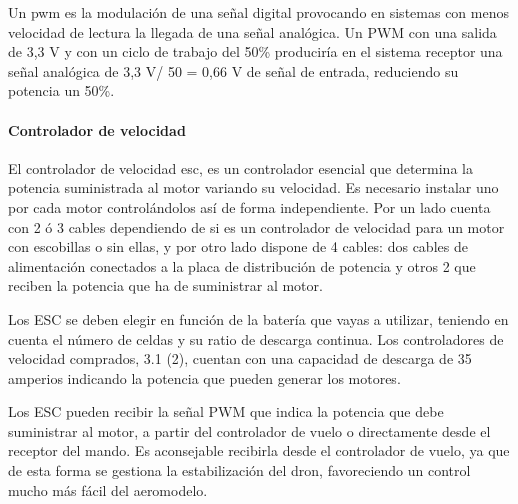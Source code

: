  
 Un \acl{pwm} es la modulación de una señal digital provocando en sistemas con menos velocidad de lectura la llegada de una señal analógica. Un PWM con una salida de 3,3 V y con un ciclo de trabajo del 50\% produciría en el sistema receptor una señal analógica de 3,3 V/ 50 = 0,66 V de señal de entrada, reduciendo su potencia un 50\%.

 
 \paragraph{Controlador de velocidad}
 \label{SSS:Controlador de velocidad}
 


 El controlador de velocidad \ac{esc}, es un controlador esencial que determina la potencia suministrada al motor variando su velocidad. Es necesario instalar uno por cada motor controlándolos así de forma independiente.
 Por un lado cuenta con 2 ó 3 cables dependiendo de si es un controlador de velocidad para un motor con escobillas o sin ellas, y por otro lado dispone de 4 cables: dos cables de alimentación conectados a la placa de distribución de potencia y otros 2 que reciben la potencia que ha de suministrar al motor.
 
 
 Los ESC se deben elegir en función de la batería que vayas a utilizar, teniendo en cuenta el número de celdas y su ratio de descarga continua. Los controladores de velocidad comprados, 3.1 (2), cuentan con una capacidad de descarga de 35 amperios indicando la potencia que pueden generar los motores. 
 
 Los ESC pueden recibir la señal PWM que indica la potencia que debe suministrar al motor, a partir del controlador de vuelo o directamente desde el receptor del mando. Es aconsejable recibirla desde el controlador de vuelo, ya que de esta forma se gestiona la estabilización del dron, favoreciendo un control mucho más fácil del aeromodelo\cite{OscarSerrano}. 

